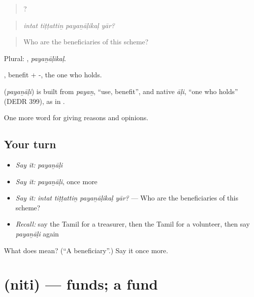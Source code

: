\begin{quote}
   ?
\end{quote}

\begin{quote}
\emph{intat tiṭṭattiṉ payaṉāḷikaḷ yār?}
\end{quote}

\begin{quote}
Who are the beneficiaries of this scheme?
\end{quote}

Plural: , \emph{payaṉāḷikaḷ}.

, benefit + -, the one who holds.

\begin{cousinweb}
\textbf{} (\emph{payaṉāḷi}) is built from \emph{payaṉ}, \textquotedblleft{}use, benefit\textquotedblright{}, and native \emph{āḷi}, \textquotedblleft{}one who holds\textquotedblright{} (DEDR 399), as in .
\end{cousinweb}

\begin{grammarlens}[title={What you've built}]
One more word for giving reasons and opinions.
\end{grammarlens}

\subsection*{Your turn}
\begin{itemize}
\raggedright
  \item \emph{Say it:} \emph{payaṉāḷi}
  \item \emph{Say it:} \emph{payaṉāḷi}, once more
  \item \emph{Say it:} \emph{intat tiṭṭattiṉ payaṉāḷikaḷ yār?} — Who are the beneficiaries of this scheme?
  \item \emph{Recall:} say the Tamil for a treasurer, then the Tamil for a volunteer, then say \emph{payaṉāḷi} again
\end{itemize}

\begin{tcolorbox}[breakable,colback=teal!4,colframe=teal!35!black,title={Before you move on}]
What does  mean? (\textquotedblleft{}A beneficiary\textquotedblright{}.) Say it once more.
\end{tcolorbox}
\section[\texorpdfstring{\ta{நிதி} (niti)}{நிதி (niti)}]{ (niti) — funds; a fund}

